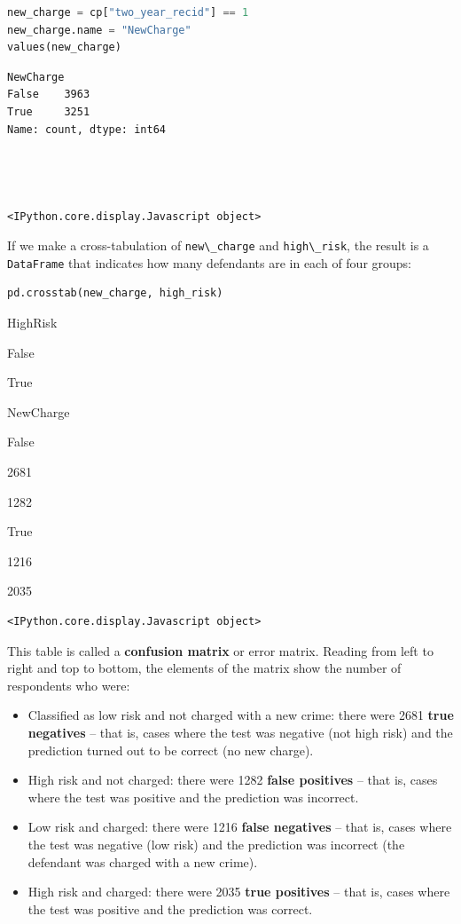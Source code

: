 \begin{lstlisting}[language=Python,style=source]
new_charge = cp["two_year_recid"] == 1
new_charge.name = "NewCharge"
values(new_charge)
\end{lstlisting}

\begin{lstlisting}[style=output]
NewCharge
False    3963
True     3251
Name: count, dtype: int64




<IPython.core.display.Javascript object>
\end{lstlisting}

If we make a cross-tabulation of \passthrough{\lstinline!new\_charge!}
and \passthrough{\lstinline!high\_risk!}, the result is a
\passthrough{\lstinline!DataFrame!} that indicates how many defendants
are in each of four groups:

\begin{lstlisting}[language=Python,style=source]
pd.crosstab(new_charge, high_risk)
\end{lstlisting}

HighRisk

False

True

NewCharge

False

2681

1282

True

1216

2035

\begin{lstlisting}[style=output]
<IPython.core.display.Javascript object>
\end{lstlisting}

This table is called a \textbf{confusion matrix} or error matrix.
Reading from left to right and top to bottom, the elements of the matrix
show the number of respondents who were:

\begin{itemize}
\item
  Classified as low risk and not charged with a new crime: there were
  2681 \textbf{true negatives} -- that is, cases where the test was
  negative (not high risk) and the prediction turned out to be correct
  (no new charge).
\item
  High risk and not charged: there were 1282 \textbf{false positives} --
  that is, cases where the test was positive and the prediction was
  incorrect.
\item
  Low risk and charged: there were 1216 \textbf{false negatives} -- that
  is, cases where the test was negative (low risk) and the prediction
  was incorrect (the defendant was charged with a new crime).
\item
  High risk and charged: there were 2035 \textbf{true positives} -- that
  is, cases where the test was positive and the prediction was correct.
\end{itemize}

